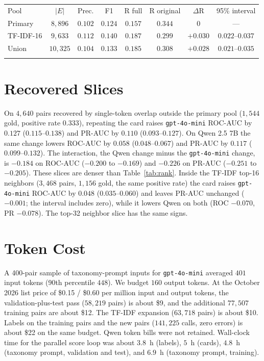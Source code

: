 \documentclass{ws-ijait}
\begin{document}
\begin{table}[th]
{\begin{tabular}{@{}lccccccc@{}}
\toprule
Pool & $\lvert E\rvert$ & Prec. & {F1} & R full & R original & $\Delta$R & 95\% interval \\
\colrule
Primary & $8{,}896$ & $0.102$ & $0.124$ & $0.157$ & $0.344$ & $0$ & --- \\
{TF}-{IDF}-16 & $9{,}633$ & $0.112$ & $0.140$ & $0.187$ & $0.299$ & $+0.030$ & $0.022$--$0.037$ \\
Union & $10{,}325$ & $0.104$ & $0.133$ & $0.185$ & $0.308$ & $+0.028$ & $0.021$--$0.035$ \\
\botrule
\end{tabular}}
\label{tab:expand}
\end{table}

\section{Recovered Slices}
\label{app:slices}
On $4{,}640$ pairs recovered by single-token overlap outside the
primary pool ($1{,}544$ gold, positive rate $0.333$), repeating the
card raises \texttt{gpt-4o-mini} {ROC}-{AUC} by $0.127$
($0.115$--$0.138$) and {PR}-{AUC} by $0.110$ ($0.093$--$0.127$).
On {Qwen} 2.5 7B the same change lowers {ROC}-{AUC} by $0.058$
($0.048$--$0.067$) and {PR}-{AUC} by $0.117$ ($0.099$--$0.132$).
The interaction, the {Qwen} change minus the \texttt{gpt-4o-mini}
change, is $-0.184$ on {ROC}-{AUC} ($-0.200$ to $-0.169$) and
$-0.226$ on {PR}-{AUC} ($-0.251$ to $-0.205$).
These slices are denser than Table~\ref{tab:rank}.
Inside the {TF}-{IDF} top-16 neighbors ($3{,}468$ pairs, $1{,}156$
gold, the same positive rate) the card raises \texttt{gpt-4o-mini}
{ROC}-{AUC} by $0.048$ ($0.035$--$0.060$) and leaves {PR}-{AUC}
unchanged ($-0.001$; the interval includes zero), while it lowers
{Qwen} on both ({ROC} $-0.070$, {PR} $-0.078$).
The top-32 neighbor slice has the same signs.

\section{Token Cost}
\label{app:cost}
A 400-pair sample of taxonomy-prompt inputs for \texttt{gpt-4o-mini}
averaged $401$ input tokens (90th percentile $448$).
We budget $160$ output tokens.
At the October 2026 list price of \$0.15 / \$0.60 per million input
and output tokens, the validation-plus-test pass ($58{,}219$ pairs)
is about \$9, and the additional $77{,}507$ training pairs are about
\$12.
The {TF}-{IDF} expansion ($63{,}718$ pairs) is about \$10.
Labels on the training pairs and the new pairs ($141{,}225$ calls,
zero errors) is about \$22 on the same budget.
{Qwen} token bills were not retained.
Wall-clock time for the parallel score loop was about $3.8$~h
(labels), $5$~h (cards), $4.8$~h (taxonomy prompt, validation and
test), and $6.9$~h (taxonomy prompt, training).



\end{document}
